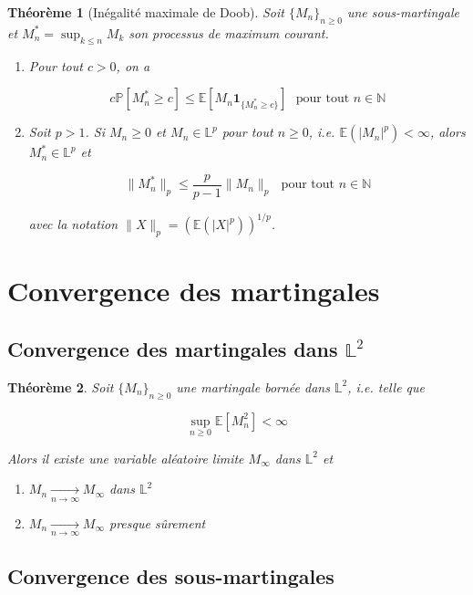 \documentclass[10pt,a4paper,oneside]{article}
\newtheorem{theoreme}{Théorème}
\begin{document}
\begin{theoreme}[Inégalité maximale de Doob]
Soit $\{ M_n \}_{n \geq 0}$ une sous-martingale et $M_n^* = \sup_{k \leq n} M_k$ son processus de maximum courant.

\begin{enumerate}
\item
Pour tout $c > 0$, on a

\[ c \mathbb{P}[M_n^* \geq c] \leq \mathbb{E}[M_n \textbf{1}_{ \{ M_n^* \geq c \} }]\ \ \ \text{pour tout } n \in \mathbb{N} \]

\item
Soit $p > 1$. Si $M_n \geq 0$ et $M_n \in \mathbb{L}^p$ pour tout $n \geq 0$, i.e. $\mathbb{E}(|M_n|^p) < \infty$, alors $M_n^* \in \mathbb{L}^p$ et

\[ \| M_n^* \|_p \leq \frac{p}{p - 1}\| M_n \|_p\ \ \ \text{pour tout }n \in \mathbb{N} \]

avec la notation $\| X \|_p = (\mathbb{E}(|X|^p))^{1 / p}$.
\end{enumerate}
\end{theoreme}

\section{Convergence des martingales}

\subsection{Convergence des martingales dans $\mathbb{L}^2$}

\begin{theoreme}
Soit $\{ M_n \}_{n \geq 0}$ une martingale bornée dans $\mathbb{L}^2$, i.e. telle que

\[ \sup_{n \geq 0} \mathbb{E}[M_n^2] < \infty \]

Alors il existe une variable aléatoire limite $M_\infty$ dans $\mathbb{L}^2$ et

\begin{enumerate}
\item
$M_n \underset{n \to \infty}{\longrightarrow} M_\infty$ dans $\mathbb{L}^2$
\item
$M_n \underset{n \to \infty}{\longrightarrow} M_\infty$ presque sûrement
\end{enumerate}
\end{theoreme}

\subsection{Convergence des sous-martingales}
\end{document}
